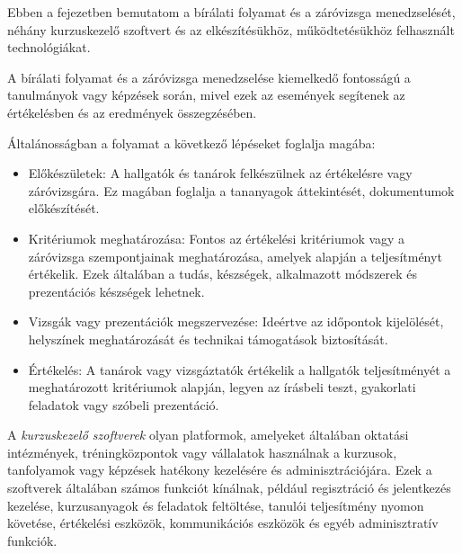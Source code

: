 
Ebben a fejezetben bemutatom a bírálati folyamat és a záróvizsga menedzselését, néhány kurzuskezelő szoftvert és az elkészítésükhöz, működtetésükhöz felhasznált technológiákat.


A bírálati folyamat és a záróvizsga menedzselése kiemelkedő fontosságú a tanulmányok vagy képzések során, mivel ezek az események segítenek az értékelésben és az eredmények összegzésében.

Általánosságban a folyamat a következő lépéseket foglalja magába:

\begin{itemize}

\item Előkészületek: A hallgatók és tanárok felkészülnek az értékelésre vagy záróvizsgára. Ez magában foglalja a tananyagok áttekintését, dokumentumok előkészítését.

\item Kritériumok meghatározása: Fontos az értékelési kritériumok vagy a záróvizsga szempontjainak meghatározása, amelyek alapján a teljesítményt értékelik. Ezek általában a tudás, készségek, alkalmazott módszerek és prezentációs készségek lehetnek.

\item Vizsgák vagy prezentációk megszervezése: Ideértve az időpontok kijelölését, helyszínek meghatározását és technikai támogatások biztosítását.

\item Értékelés: A tanárok vagy vizsgáztatók értékelik a hallgatók teljesítményét a meghatározott kritériumok alapján, legyen az írásbeli teszt, gyakorlati feladatok vagy szóbeli prezentáció.

\end{itemize}



A \textit{kurzuskezelő szoftverek} \cite{course} olyan platformok, amelyeket általában oktatási intézmények, tréningközpontok vagy vállalatok használnak a kurzusok, tanfolyamok vagy képzések hatékony kezelésére és adminisztrációjára. Ezek a szoftverek általában számos funkciót kínálnak, például regisztráció és jelentkezés kezelése, kurzusanyagok és feladatok feltöltése, tanulói teljesítmény nyomon követése, értékelési eszközök, kommunikációs eszközök és egyéb adminisztratív funkciók.

